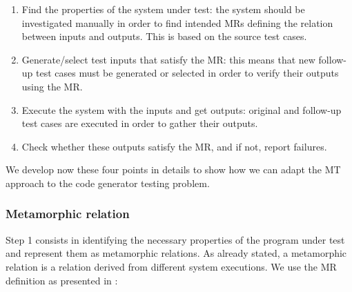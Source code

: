 \begin{enumerate}
 \item Find the properties of the system under test: the system should be investigated manually in order to find intended MRs defining the relation between inputs and outputs. This is based on the source test cases.
 \item Generate/select test inputs that satisfy the MR: this means that new follow-up test cases must be generated or selected in order to verify their outputs using the MR.
 \item Execute the system with the inputs and get outputs: original and follow-up test cases are executed in order to gather their outputs.
 \item Check whether these outputs satisfy the MR, and if not, report failures.
\end{enumerate}

We develop now these four points in details to show how we can adapt the MT approach to the code generator testing problem. 
\subsubsection[(Step 1)]{Metamorphic relation }

Step 1 consists in identifying the necessary properties of the program under test and represent them as metamorphic relations. As already stated, a metamorphic relation is a relation derived from different system executions.
We use the MR definition as presented in \cite{tao2010automatic,chan2006integration}:

